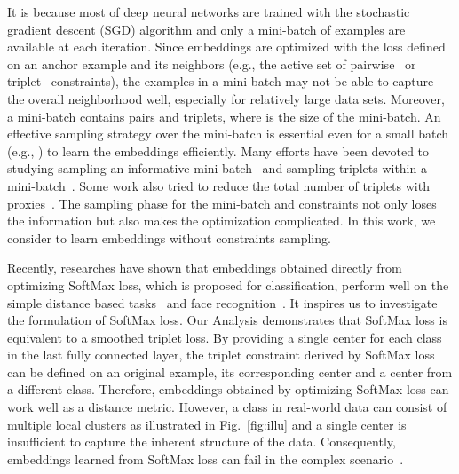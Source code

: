 \documentclass[10pt,twocolumn,letterpaper]{article}
\begin{document}
It is because most of deep neural networks are trained with the stochastic gradient descent (SGD) algorithm and only a mini-batch of examples are available at each iteration. Since embeddings are optimized with the loss defined on an anchor example and its neighbors (e.g., the active set of pairwise~\cite{XingNJR02} or triplet~\cite{WeinbergerS09} constraints), the examples in a mini-batch may not be able to capture the overall neighborhood well, especially for relatively large data sets. Moreover, a mini-batch contains  pairs and  triplets, where  is the size of the mini-batch. An effective sampling strategy over the mini-batch is essential even for a small batch (e.g., ) to learn the embeddings efficiently. Many efforts have been devoted to studying sampling an informative mini-batch~\cite{RippelPDB15,SchroffKP15} and sampling triplets within a mini-batch~\cite{ManmathaWSK17,SongXJS16}. Some work also tried to reduce the total number of triplets with proxies~\cite{Attias17,QianTLZJ18}. The sampling phase for the mini-batch and constraints not only loses the information but also makes the optimization complicated. In this work, we consider to learn embeddings without constraints sampling.

Recently, researches have shown that embeddings obtained directly from optimizing SoftMax loss, which is proposed for classification, perform well on the simple distance based tasks~\cite{Sohn16,WenZL016} and face recognition~\cite{07698, LiuWYLRS17,LiuWYY16,WangCLL18,WangWZJGZL018}. It inspires us to investigate the formulation of SoftMax loss. Our Analysis demonstrates that SoftMax loss is equivalent to a smoothed triplet loss. By providing a single center for each class in the last fully connected layer, the triplet constraint derived by SoftMax loss can be defined on an original example, its corresponding center and a center from a different class. Therefore, embeddings obtained by optimizing SoftMax loss can work well as a distance metric. However, a class in real-world data can consist of multiple local clusters as illustrated in Fig.~\ref{fig:illu} and a single center is insufficient to capture the inherent structure of the data. Consequently, embeddings learned from SoftMax loss can fail in the complex scenario~\cite{Sohn16}.
\end{document}
